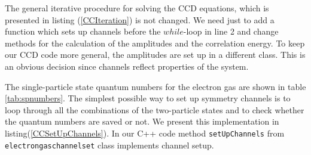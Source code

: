 \documentclass[twoside,english]{uiofysmaster}
\newcommand{\classname}[1]{\texttt{#1}}
\begin{document}
The general iterative procedure for solving the CCD equations, which
is presented in listing (\ref{CCIteration}) is not changed. We need
just to add a function which sets up channels before the $while$-loop in
line 2 and change methods for the calculation of the amplitudes and
the correlation energy. To keep our CCD code more general, the
amplitudes are set up in a different class. This is an obvious
decision since channels reflect properties of the system.

The single-particle state quantum numbers for the electron gas are shown in table \ref{tab:spnumbers}. The simplest possible way to set up symmetry channels is to loop through all the combinations of the two-particle states and to check whether the quantum numbers are saved or not. We present this implementation in listing(\ref{CCSetUpChannels}). In our C++ code method \classname{setUpChannels}  from \classname{electrongaschannelset} class implements channel setup.
\end{document}
